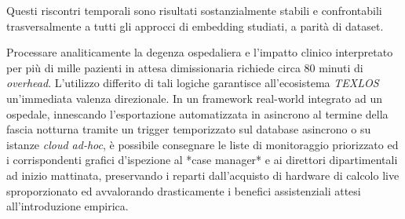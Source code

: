 Questi riscontri temporali sono risultati sostanzialmente stabili e confrontabili trasversalmente a tutti gli approcci di embedding studiati, a parità di dataset.

Processare analiticamente la degenza ospedaliera e l'impatto clinico interpretato per più di mille pazienti in attesa dimissionaria richiede circa 80 minuti di \textit{overhead}. L'utilizzo differito di tali logiche garantisce all'ecosistema \textit{TEXLOS} un'immediata valenza direzionale. In un framework real-world integrato ad un ospedale, innescando l'esportazione automatizzata in asincrono al termine della fascia notturna tramite un trigger temporizzato sul database asincrono o su istanze \textit{cloud ad-hoc}, è possibile consegnare le liste di monitoraggio priorizzato ed i corrispondenti grafici d'ispezione al *case manager* e ai direttori dipartimentali ad inizio mattinata, preservando i reparti dall'acquisto di hardware di calcolo live sproporzionato ed avvalorando drasticamente i benefici assistenziali attesi all'introduzione empirica.